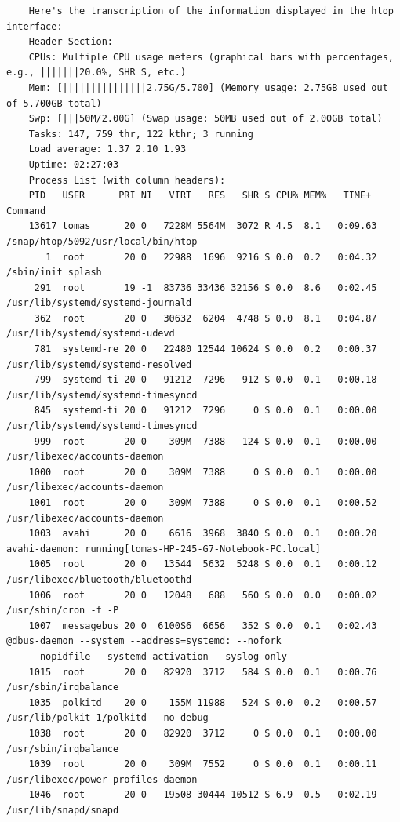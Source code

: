 \documentclass{article}
\begin{document}
\begin{commandline}
  {\scriptsize
    \begin{verbatim}
    Here's the transcription of the information displayed in the htop interface:
    Header Section:
    CPUs: Multiple CPU usage meters (graphical bars with percentages, e.g., |||||||20.0%, SHR S, etc.)
    Mem: [|||||||||||||||2.75G/5.700] (Memory usage: 2.75GB used out of 5.700GB total)
    Swp: [|||50M/2.00G] (Swap usage: 50MB used out of 2.00GB total)
    Tasks: 147, 759 thr, 122 kthr; 3 running
    Load average: 1.37 2.10 1.93
    Uptime: 02:27:03
    Process List (with column headers):
    PID   USER      PRI NI   VIRT   RES   SHR S CPU% MEM%   TIME+  Command
    13617 tomas      20 0   7228M 5564M  3072 R 4.5  8.1   0:09.63 /snap/htop/5092/usr/local/bin/htop
       1  root       20 0   22988  1696  9216 S 0.0  0.2   0:04.32 /sbin/init splash
     291  root       19 -1  83736 33436 32156 S 0.0  8.6   0:02.45 /usr/lib/systemd/systemd-journald
     362  root       20 0   30632  6204  4748 S 0.0  8.1   0:04.87 /usr/lib/systemd/systemd-udevd
     781  systemd-re 20 0   22480 12544 10624 S 0.0  0.2   0:00.37 /usr/lib/systemd/systemd-resolved
     799  systemd-ti 20 0   91212  7296   912 S 0.0  0.1   0:00.18 /usr/lib/systemd/systemd-timesyncd
     845  systemd-ti 20 0   91212  7296     0 S 0.0  0.1   0:00.00 /usr/lib/systemd/systemd-timesyncd
     999  root       20 0    309M  7388   124 S 0.0  0.1   0:00.00 /usr/libexec/accounts-daemon
    1000  root       20 0    309M  7388     0 S 0.0  0.1   0:00.00 /usr/libexec/accounts-daemon
    1001  root       20 0    309M  7388     0 S 0.0  0.1   0:00.52 /usr/libexec/accounts-daemon
    1003  avahi      20 0    6616  3968  3840 S 0.0  0.1   0:00.20 avahi-daemon: running[tomas-HP-245-G7-Notebook-PC.local]
    1005  root       20 0   13544  5632  5248 S 0.0  0.1   0:00.12 /usr/libexec/bluetooth/bluetoothd
    1006  root       20 0   12048   688   560 S 0.0  0.0   0:00.02 /usr/sbin/cron -f -P
    1007  messagebus 20 0  6100S6  6656   352 S 0.0  0.1   0:02.43 @dbus-daemon --system --address=systemd: --nofork 
    --nopidfile --systemd-activation --syslog-only
    1015  root       20 0   82920  3712   584 S 0.0  0.1   0:00.76 /usr/sbin/irqbalance
    1035  polkitd    20 0    155M 11988   524 S 0.0  0.2   0:00.57 /usr/lib/polkit-1/polkitd --no-debug
    1038  root       20 0   82920  3712     0 S 0.0  0.1   0:00.00 /usr/sbin/irqbalance
    1039  root       20 0    309M  7552     0 S 0.0  0.1   0:00.11 /usr/libexec/power-profiles-daemon
    1046  root       20 0   19508 30444 10512 S 6.9  0.5   0:02.19 /usr/lib/snapd/snapd

\end{verbatim}}
\end{commandline}
\end{document}
